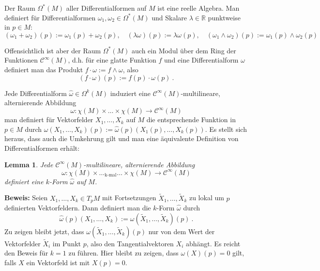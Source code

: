 \documentclass[12pt,a4paper]{article}
\def\R{\mathbb{R}}
\newtheorem{Lemma}{Lemma}[section]
\def\proof{\noindent\textbf{Beweis:}\quad}
\begin{document}
\bigskip

Der Raum $\Omega^*(M)$ aller Differentialformen auf $M$ ist eine reelle Algebra. Man definiert
f\"ur Differentialformen $\omega_1, \omega_2 \in \Omega^*(M)$ und Skalare $\lambda \in \R$ punktweise in
$p \in M$:
$$
(\omega_1+\omega_2)(p):= \omega_1(p) + \omega_2(p),\quad (\lambda \omega)(p) := \lambda \omega(p),\quad
(\omega_1 \wedge \omega_2)(p) := \omega_1(p) \wedge \omega_2(p)
$$

\bigskip

Offensichtlich ist aber der Raum  $\Omega^*(M)$ auch ein Modul \"uber dem Ring der Funktionen
$\mathcal C^\infty(M)$, d.h. f\"ur eine glatte Funktion $f$ und eine Differentialform $\omega$
definiert man das Produkt $f\cdot \omega := f \wedge \omega$, also
$$
(f\cdot \omega)(p) := f(p) \cdot \omega(p) \ .
$$

\bigskip

Jede Differentialform $\hat\omega \in \Omega^k(M)$ induziert eine $\mathcal C^\infty(M)$-multilineare,
alternierende Abbildung
$$
\omega : \chi(M) \times \ldots \times \chi(M) \rightarrow \mathcal C^\infty(M)
$$
man definiert f\"ur Vektorfelder $X_1, \ldots, X_k$ auf $M$ die entsprechende Funktion in $p \in M$ durch
$\omega(X_1, \ldots, X_k)(p) :=\hat\omega(p)(X_1(p), \ldots, X_k(p)) $. Es stellt sich heraus, dass auch die
Umkehrung gilt und man eine \"aquivalente Definition von Differentialformen erh\"alt:

\begin{Lemma}
Jede $\mathcal C^\infty(M)$-multilineare,
alternierende Abbildung
$$
\omega : \chi(M) \times \ldots_{\mbox{k-mal}} \ldots \times \chi(M) \rightarrow \mathcal C^\infty(M)
$$
definiert eine $k$-Form $\hat\omega$ auf $M$.
\end{Lemma}
\proof
Seien $X_1, \ldots, X_k \in T_pM$ mit Fortsetzungen $\tilde X_1, \ldots, \tilde X_k$ zu lokal um $p$
definierten Vektorfeldern. Dann definiert man die $k$-Form $\hat\omega$ durch
$$
\hat \omega(p)(X_1, \ldots, X_k) := \omega(\tilde X_1, \ldots, \tilde X_k)(p) \ .
$$
Zu zeigen bleibt jetzt, dass  $\omega(\tilde X_1, \ldots, \tilde X_k)(p)$ nur von dem Wert der
Vektorfelder $\tilde X_i$ im Punkt $p$, also den Tangentialvektoren $X_i$ abh\"angt. Es reicht den
Beweis f\"ur $k=1$ zu f\"uhren. Hier bleibt zu zeigen, dass $\omega(X)(p)=0$ gilt, falls $X$ ein
Vektorfeld ist mit $X(p)=0$.

\medskip
\end{document}
